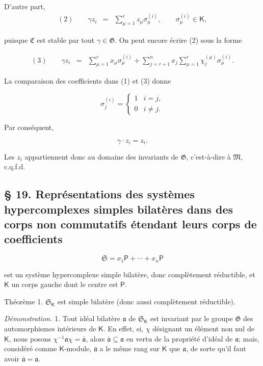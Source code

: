 D'autre part,
\[
\begin{array}{rcl}
(2)\qquad \gamma z_i&=&\displaystyle\sum_{\mu=1}^{r}z_\mu\sigma_\mu^{(i)},
\qquad \sigma_\mu^{(i)}\in\mathsf K,
\end{array}
\]

puisque \(\mathfrak C\) est stable par tout \(\gamma\in\mathfrak G\). On peut encore écrire (2) sous la forme

\[
\begin{array}{rcl}
(3)\qquad \gamma z_i
&=&\displaystyle\sum_{\mu=1}^{r}x_\mu\sigma_\mu^{(i)}
+\displaystyle\sum_{j=r+1}^{n}x_j\sum_{\mu=1}^{r}\chi_j^{(\mu)}\sigma_\mu^{(i)}.
\end{array}
\]

La comparaison des coefficients dans (1) et (3) donne

\[
\sigma_j^{(i)}=
\begin{cases}
1 & i=j,\\
0 & i\ne j.
\end{cases}
\]

Par conséquent,

\[
\gamma\cdot z_i=z_i.
\]

Les \(z_i\) appartiennent donc au domaine des invariants de \(\mathfrak G\), c'est-à-dire à \(\mathfrak M\), c.q.f.d.

\subsection*{\S{} 19. Représentations des systèmes hypercomplexes simples bilatères dans des corps non commutatifs étendant leurs corps de coefficients}\label{fr-r823-representations-systemes-simples-bilateres}

\[
\mathfrak S=x_1\mathsf P+\cdots+x_n\mathsf P
\]

est un système hypercomplexe simple bilatère, donc complètement réductible, et \(\mathsf K\) un corps gauche dont le centre est \(\mathsf P\).

Théorème 1. \(\mathfrak S_{\mathsf K}\) est simple bilatère (donc aussi complètement réductible).

\emph{Démonstration.} 1. Tout idéal bilatère \(\mathfrak a\) de \(\mathfrak S_{\mathsf K}\) est invariant par le groupe \(\mathfrak G\) des automorphismes intérieurs de \(\mathsf K\). En effet, si, \(\chi\) désignant un élément non nul de \(\mathsf K\), nous posons \(\chi^{-1}\mathfrak a\chi=\overline{\mathfrak a}\), alors \(\overline{\mathfrak a}\subseteq\mathfrak a\) en vertu de la propriété d'idéal de \(\mathfrak a\); mais, considéré comme \(\mathsf K\)-module, \(\overline{\mathfrak a}\) a le même rang sur \(\mathsf K\) que \(\mathfrak a\), de sorte qu'il faut avoir \(\overline{\mathfrak a}=\mathfrak a\).

